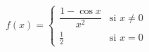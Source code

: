 \item $f(x) = \begin{cases} \dfrac{1 - \cos x}{x^2} & \text{si } x \ne 0 \\ \frac{1}{2} & \text{si } x = 0 \end{cases}$
